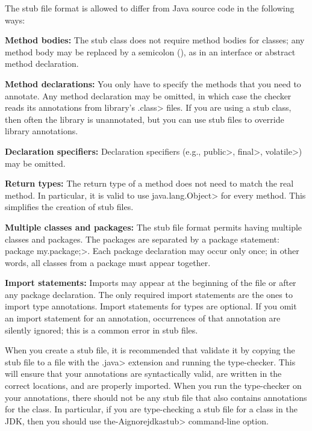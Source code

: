 The stub file format is allowed to differ from Java source code in the
following ways:
\begin{description}

\item{\textbf{Method bodies:}}
  The stub class does not require method bodies for classes; any method
  body may be replaced by a semicolon (\code{;}), as in an interface or
  abstract method declaration.

\item{\textbf{Method declarations:}}
  You only have to specify the methods that you need to annotate.
  Any method declaration may be omitted, in which case the checker reads
  its annotations from library's \<.class> files.  If you are using a stub class, then
  often the library is unannotated, but you can use stub files to override
  library annotations.

\item{\textbf{Declaration specifiers:}}
  Declaration specifiers (e.g., \<public>, \<final>, \<volatile>)
  may be omitted.

\item{\textbf{Return types:}}
  The return type of a method does not need to match the real method.
  In particular, it is valid to use \<java.lang.Object> for every method.
  This simplifies the creation of stub files.

\item{\textbf{Multiple classes and packages:}}
  The stub file format permits having multiple classes and packages.
  The packages are separated by a package statement:
  \<package my.package;>.  Each package declaration may occur only once; in
  other words, all classes from a package must appear together.

\item{\textbf{Import statements:}}
  Imports may appear at the beginning of the file or after any package declaration.
  The only required import statements are the ones to import type
  annotations.  Import statements for types are optional.  If you omit an
  import statement for an annotation, occurrences of that annotation are
  silently ignored; this is a common error in stub files.

\end{description}

When you create a stub file, it is recommended that validate it by copying
the stub file to a file with the \<.java> extension and running the
type-checker.  This will ensure that your annotations are syntactically
valid, are written in the correct locations, and are properly imported.
When you run the type-checker on your annotations, there should not be any
stub file that also contains annotations for the class.  In particular, if
you are type-checking a stub file for a class in the JDK, then you should
use the\<-Aignorejdkastub> command-line option.


